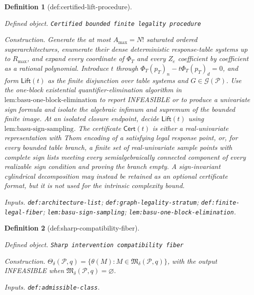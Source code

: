 \documentclass{article}
\newtheorem{definition}{Definition}
\begin{document}
\begin{definition}[def:certified-lift-procedure]\label{def:certified-lift-procedure}
\par\smallskip\noindent\emph{Defined object.} \texttt{Certified bounded finite legality procedure}
\par\smallskip\noindent\emph{Construction.} Generate the at most \(A_{\max}=N!\) saturated ordered superarchitectures, enumerate their dense deterministic response-table systems up to \(R_{\max}\), and expand every coordinate of \(\Phi_T\) and every \(Z_e\) coefficient by coefficient as a rational polynomial.  Introduce \(t\) through \(\Phi_T(p_T)_n-t\Phi_T(p_T)_d=0\), and form \(\mathsf{Lift}(t)\) as the finite disjunction over table systems and \(G\in\mathcal G(\mathcal P)\).  Use the one-block existential quantifier-elimination algorithm in \(\text{lem:basu-one-block-elimination}\) to report INFEASIBLE or to produce a univariate sign formula and isolate the algebraic infimum and supremum of the bounded finite image.  At an isolated closure endpoint, decide \(\mathsf{Lift}(t)\) using \(\text{lem:basu-sign-sampling}\).  The certificate \(\mathsf{Cert}(t)\) is either a real-univariate representation with Thom encoding of a satisfying legal response point, or, for every bounded table branch, a finite set of real-univariate sample points with complete sign lists meeting every semialgebraically connected component of every realizable sign condition and proving the branch empty.  A sign-invariant cylindrical decomposition may instead be retained as an optional certificate format, but it is not used for the intrinsic complexity bound.
\par\smallskip\noindent\emph{Inputs.} \texttt{def:\allowbreak{}architecture-\allowbreak{}list}; \texttt{def:\allowbreak{}graph-\allowbreak{}legality-\allowbreak{}stratum}; \texttt{def:\allowbreak{}finite-\allowbreak{}legal-\allowbreak{}fiber}; \texttt{lem:\allowbreak{}basu-\allowbreak{}sign-\allowbreak{}sampling}; \texttt{lem:\allowbreak{}basu-\allowbreak{}one-\allowbreak{}block-\allowbreak{}elimination}.
\end{definition}

\begin{definition}[def:sharp-compatibility-fiber]\label{def:sharp-compatibility-fiber}
\par\smallskip\noindent\emph{Defined object.} \texttt{Sharp intervention compatibility fiber}
\par\smallskip\noindent\emph{Construction.} \(\Theta_\delta(\mathcal P,q)=\{\theta(M):M\in\mathfrak M_\delta(\mathcal P,q)\}\), with the output INFEASIBLE when \(\mathfrak M_\delta(\mathcal P,q)=\varnothing\).
\par\smallskip\noindent\emph{Inputs.} \texttt{def:\allowbreak{}admissible-\allowbreak{}class}.
\end{definition}
\end{document}
